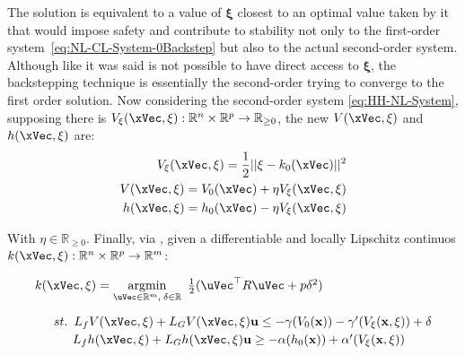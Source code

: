 The solution is equivalent to a value of \(\mathbf{\xi}\) closest to an optimal value taken by it that would impose safety and contribute to stability not only to the first-order system~\ref{eq:NL-CL-System-0Backstep} but also to the actual second-order system. Although like it was said is not possible to have direct access to \(\mathbf{\xi}\), the backstepping technique is essentially the second-order trying to converge to the first order solution. Now considering the second-order system \ref{eq:HH-NL-System}, supposing there is \( V_{\mathbf{\xi}}(\xVec, \mathbf{\xi}): \mathbb{R}^n \times \mathbb{R}^p \rightarrow \mathbb{R}_{\geq 0} \), the new  \(V(\xVec, \mathbf{\xi})\) and  \(h(\xVec, \mathbf{\xi})\) are:
\begin{subequations}
    \label{eq:Backstepp_CF}
    \begin{align}
        V_{\mathbf{\xi}}(\xVec, \mathbf{\xi}) = \frac{1}{2}|| \mathbf{\xi} -  k_0(\xVec) ||^2 
        \label{eq:Backstepp_prejudice}\\
        V(\xVec, \mathbf{\xi}) = V_0(\xVec) + \eta V_{\mathbf{\xi}}(\xVec, \mathbf{\xi}) 
        \label{eq:Backstepp_V}\\
        h(\xVec, \mathbf{\xi}) = h_0(\xVec) - \eta V_{\mathbf{\xi}}(\xVec, \mathbf{\xi})
        \label{eq:Backstepp_h}
    \end{align}
\end{subequations}


With \(\eta \in \mathbb{R}_{\geq 0}\). Finally, via , given a differentiable and locally Lipschitz continuos \(k(\xVec, \mathbf{\xi}):\mathbb{R}^n \times \mathbb{R}^p \to \mathbb{R}^m\):

\begin{equation}
    \begin{array}{l}
        k(\xVec, \mathbf{\xi}) = \underset{\uVec \in \mathbb{R}^m, \hspace{0.2em} \delta \in \mathbb{R}}{\mathrm{argmin}} \quad \hspace{-0.5em} \frac{1}{2} (\uVec^\top R \uVec + p\delta^2 ) \vspace{1em} \\ 
        \quad \hspace{0.5em}  st. \hspace{0.5em} L_fV(\xVec, \mathbf{\xi}) + L_GV(\xVec, \mathbf{\xi})\mathbf{u} \leq -\gamma(V_0(\mathbf{x})) -\gamma'(V_{\mathbf{\xi}}(\mathbf{x}, \mathbf{\xi})) + \delta \vspace{0.25em}\\
        \quad \quad \hspace{1em}                 L_fh(\xVec, \mathbf{\xi}) + L_Gh(\xVec, \mathbf{\xi})\mathbf{u} \geq -\alpha(h_0(\mathbf{x})) + \alpha'(V_{\mathbf{\xi}}(\mathbf{x}, \mathbf{\xi}))
    \end{array}
 \label{eq:CLF-CBF-QP-relaxed-1Backstep}
\end{equation}


